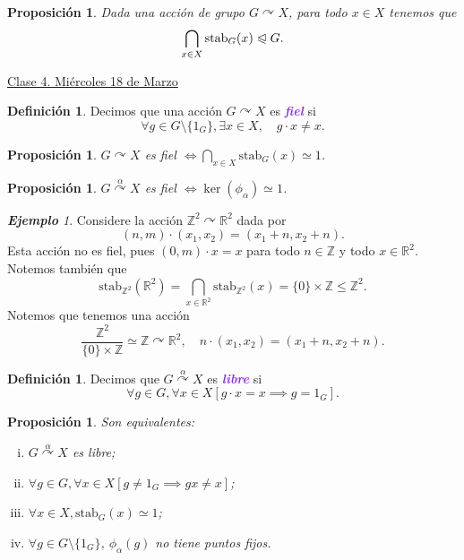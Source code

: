 \documentclass{article}
\newtheorem{proposition}[theorem]{Proposición}
\theoremstyle{definition}
\newtheorem{definition}[theorem]{Definición}
\theoremstyle{remark}
\newtheorem{example}[theorem]{\textbf{Ejemplo}}
\numberwithin{equation}{section}
\newcommand{\R}{\mathbb{R}}
\newcommand{\Z}{\mathbb{Z}}
\newcommand{\acts}{\curvearrowright}
\newcommand{\actsby}[1]{\stackrel{#1}{\acts}}
\renewcommand{\c}{\cdot}
\newcommand{\normal}{\trianglelefteqslant}
\newcommand{\stab}{\mathrm{stab}}
\newcommand{\cor}[1]{\left[ #1 \right]}
\newcommand{\ds}{\displaystyle}
\newcommand{\wea}[1]{\textcolor{BlueViolet}{\textbf{\emph{#1}}}}
\newcommand{\fecha}[1]{\begin{flushright} \underline{#1} \end{flushright}}
\begin{document}
\begin{proposition}
  Dada una acción de grupo $G \acts X$, para todo $x \in X$ tenemos que
  $$\bigcap_{x \in X} \stab_G(x) \normal G.$$
\end{proposition}

\fecha{Clase 4. Miércoles 18 de Marzo}

\begin{definition}
  Decimos que una acción $G \acts X$ es \wea{fiel} si $$\forall g \in G \setminus \{1_G\}, \exists x \in X, \quad g\c x \neq x.$$
\end{definition}

\begin{proposition}
  $G \acts X$ es fiel $\ds \iff \bigcap_{x \in X} \stab_G(x) \simeq 1$.
\end{proposition}

\begin{proposition}
  $G \actsby\alpha X$ es fiel $\iff \ker(\phi_\alpha) \simeq 1$.
\end{proposition}

\begin{example}
  Considere la acción $\Z^2 \acts \R^2$ dada por $$(n,m) \c (x_1,x_2) = (x_1 + n, x_2 + n).$$
  Esta acción no es fiel, pues $(0,m) \c x = x$ para todo $n \in \Z$ y todo $x \in \R^2$. Notemos también que
  \[\stab_{\Z^2}(\R^2) = \bigcap_{x \in \R^2} \stab_{\Z^2}(x) = \{0\} \times \Z \leqslant \Z^2.\]
  Notemos que tenemos una acción
  \[\frac{\Z^2}{\{0\} \times \Z} \simeq \Z \acts \R^2, \quad n \c (x_1,x_2) = (x_1 + n, x_2 + n).\]
\end{example}

\begin{definition}
  Decimos que $G \actsby\alpha X$ es \wea{libre} si
  \[\forall g \in G, \forall x \in X \cor{g\c x=x \implies g = 1_G}.\]
\end{definition}

\begin{proposition}
  Son equivalentes:
  \begin{enumerate}[(i)]
    \item $G \actsby\alpha X$ es libre;
    \item $\forall g \in G, \forall x \in X \cor{g \neq 1_G \implies gx \neq  x}$;
    \item $\forall x \in X, \stab_G(x) \simeq 1$;
    \item $\forall g \in G \setminus \{1_G\}$, $\phi_\alpha(g)$ no tiene puntos fijos.
  \end{enumerate}
\end{proposition}
\end{document}
